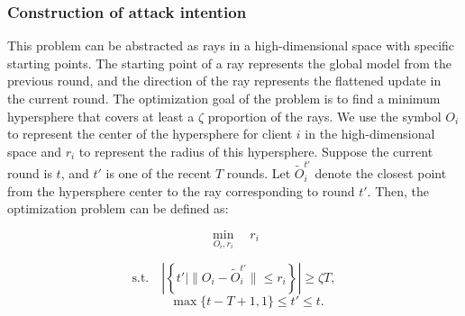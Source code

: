 \documentclass[lettersize,journal]{IEEEtran}
\begin{document}
\subsubsection{Construction of attack intention}
This problem can be abstracted as rays in a high-dimensional space with specific starting points. The starting point of a ray represents the global model from the previous round, and the direction of the ray represents the flattened update in the current round. The optimization goal of the problem is to find a minimum hypersphere that covers at least a $\zeta$ proportion of the rays.
We use the symbol $O_i$ to represent the center of the hypersphere for client $i$ in the high-dimensional space and $r_i$ to represent the radius of this hypersphere. Suppose the current round is $t$, and $t'$ is one of the recent $T$ rounds. Let $\tilde O_i^{t'}$ denote the closest point from the hypersphere center to the ray corresponding to round $t'$. Then, the optimization problem can be defined as:

\begin{equation}
    \min_{O_i, r_i} \quad r_i
\end{equation}

\begin{equation} 
\text{s.t.} \quad \left| \left\{ t' \mid \| O_i - \tilde{O}_{i}^{t'} \| \leq r_i \right\} \right| \geq \zeta T,
\end{equation}
\begin{equation} 
    \quad\quad\max\{t-T+1, 1\}\leq  t'\leq t.
\end{equation}
\end{document}
